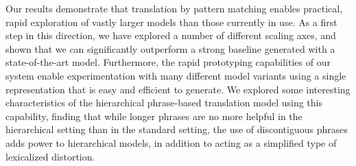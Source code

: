 Our results demonstrate that translation by pattern
matching enables practical, rapid exploration of vastly larger
models than those currently in use.  As a first
step in this direction, we have explored a number of different
scaling axes, and shown that we can significantly outperform
a strong baseline generated with a 
state-of-the-art model.  Furthermore, the rapid
prototyping capabilities of our system enable experimentation
with many different model variants using a single representation
that is easy and efficient to generate.  We
explored some interesting characteristics of the hierarchical
phrase-based translation model using this capability, finding
that while longer phrases are no more helpful in the hierarchical
setting than in the standard setting, the use of discontiguous
phrases adds power to hierarchical models, in addition to acting
as a simplified type of lexicalized distortion.





